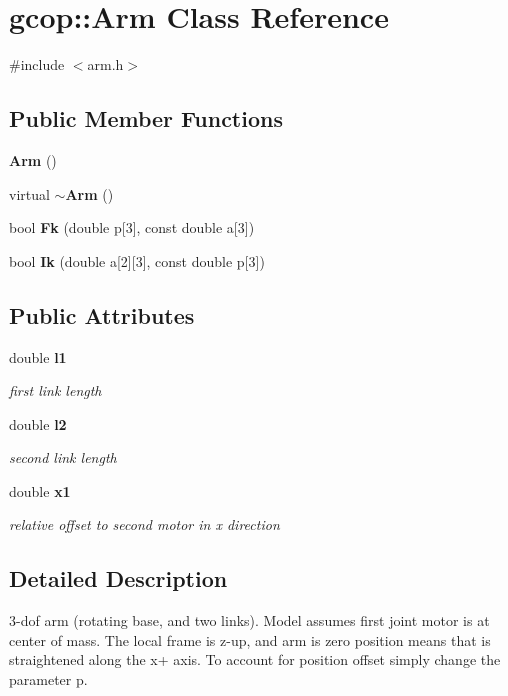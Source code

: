 \section{gcop\-:\-:\-Arm \-Class \-Reference}
\label{classgcop_1_1Arm}


{\ttfamily \#include $<$arm.\-h$>$}

\subsection*{\-Public \-Member \-Functions}
\begin{DoxyCompactItemize}
\item 
{\bf \-Arm} ()
\item 
virtual {\bf $\sim$\-Arm} ()
\item 
bool {\bf \-Fk} (double p[3], const double a[3])
\item 
bool {\bf \-Ik} (double a[2][3], const double p[3])
\end{DoxyCompactItemize}
\subsection*{\-Public \-Attributes}
\begin{DoxyCompactItemize}
\item 
double {\bf l1}
\begin{DoxyCompactList}\small\item\em first link length \end{DoxyCompactList}\item 
double {\bf l2}
\begin{DoxyCompactList}\small\item\em second link length \end{DoxyCompactList}\item 
double {\bf x1}
\begin{DoxyCompactList}\small\item\em relative offset to second motor in x direction \end{DoxyCompactList}\end{DoxyCompactItemize}


\subsection{\-Detailed \-Description}
3-\/dof arm (rotating base, and two links). \-Model assumes first joint motor is at center of mass. \-The local frame is z-\/up, and arm is zero position means that is straightened along the x+ axis. \-To account for position offset simply change the parameter p. 

